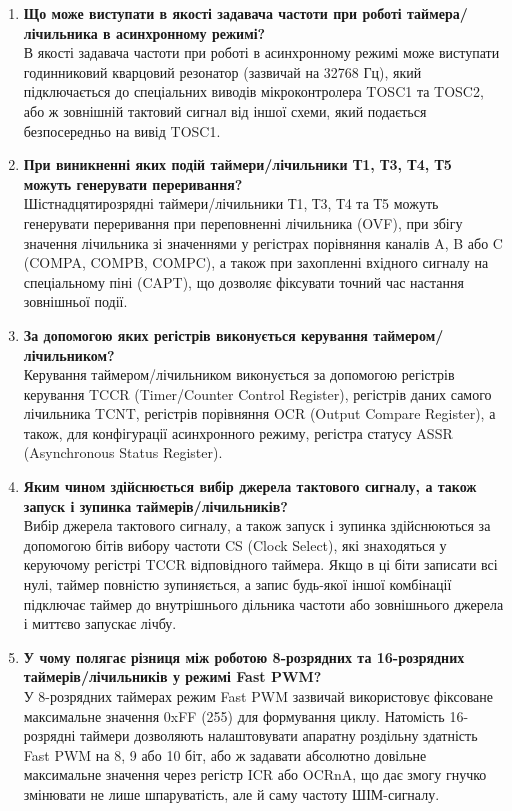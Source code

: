 \documentclass[14pt, a4paper]{extreport}
\begin{document}
\begin{enumerate}
		\item \textbf{Що може виступати в якості задавача частоти при роботі таймера/лічильника в асинхронному режимі?} \\ В якості задавача частоти при роботі в асинхронному режимі може виступати годинниковий кварцовий резонатор (зазвичай на 32768 Гц), який підключається до спеціальних виводів мікроконтролера TOSC1 та TOSC2, або ж зовнішній тактовий сигнал від іншої схеми, який подається безпосередньо на вивід TOSC1. 
		
		\newpage
		
		\item \textbf{При виникненні яких подій таймери/лічильники Т1, Т3, Т4, Т5 можуть генерувати переривання?} \\ Шістнадцятирозрядні таймери/лічильники Т1, Т3, Т4 та Т5 можуть генерувати переривання при переповненні лічильника (OVF), при збігу значення лічильника зі значеннями у регістрах порівняння каналів A, B або C (COMPA, COMPB, COMPC), а також при захопленні вхідного сигналу на спеціальному піні (CAPT), що дозволяє фіксувати точний час настання зовнішньої події.
		
		\item \textbf{За допомогою яких регістрів виконується керування таймером/лічильником?} \\ Керування таймером/лічильником виконується за допомогою регістрів керування TCCR (Timer/Counter Control Register), регістрів даних самого лічильника TCNT, регістрів порівняння OCR (Output Compare Register), а також, для конфігурації асинхронного режиму, регістра статусу ASSR (Asynchronous Status Register).
		
		\item \textbf{Яким чином здійснюється вибір джерела тактового сигналу, а також запуск і зупинка таймерів/лічильників?} \\ Вибір джерела тактового сигналу, а також запуск і зупинка здійснюються за допомогою бітів вибору частоти CS (Clock Select), які знаходяться у керуючому регістрі TCCR відповідного таймера. Якщо в ці біти записати всі нулі, таймер повністю зупиняється, а запис будь-якої іншої комбінації підключає таймер до внутрішнього дільника частоти або зовнішнього джерела і миттєво запускає лічбу.
		
		\item \textbf{У чому полягає різниця між роботою 8-розрядних та 16-розрядних таймерів/лічильників у режимі Fast PWM?} \\ У 8-розрядних таймерах режим Fast PWM зазвичай використовує фіксоване максимальне значення 0xFF (255) для формування циклу. Натомість 16-розрядні таймери дозволяють налаштовувати апаратну роздільну здатність Fast PWM на 8, 9 або 10 біт, або ж задавати абсолютно довільне максимальне значення через регістр ICR або OCRnA, що дає змогу гнучко змінювати не лише шпаруватість, але й саму частоту ШІМ-сигналу.
	\end{enumerate}
	
\end{document}
